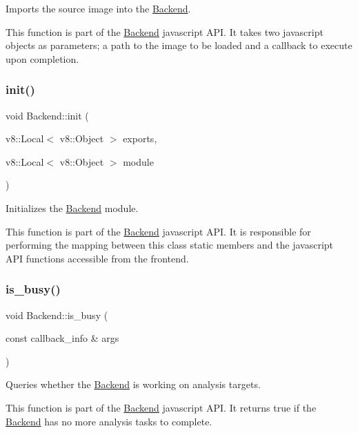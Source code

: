 Imports the source image into the \hyperlink{class_backend}{Backend}. 

This function is part of the \hyperlink{class_backend}{Backend} javascript A\+PI. It takes two javascript objects as parameters; a path to the image to be loaded and a callback to execute upon completion. \mbox{\label{class_backend_a3bbb39435c576093a6b74520ae463398}} 
\subsubsection{\texorpdfstring{init()}{init()}}
{\footnotesize\ttfamily void Backend\+::init (\begin{DoxyParamCaption}\item[{v8\+::\+Local$<$ v8\+::\+Object $>$}]{exports,  }\item[{v8\+::\+Local$<$ v8\+::\+Object $>$}]{module }\end{DoxyParamCaption})\hspace{0.3cm}{\ttfamily [static]}}



Initializes the \hyperlink{class_backend}{Backend} module. 

This function is part of the \hyperlink{class_backend}{Backend} javascript A\+PI. It is responsible for performing the mapping between this class\textquotesingle{} static members and the javascript A\+PI functions accessible from the frontend. \mbox{\label{class_backend_ad23273def503c1749707c57ac92e9212}} 
\subsubsection{\texorpdfstring{is\+\_\+busy()}{is\_busy()}}
{\footnotesize\ttfamily void Backend\+::is\+\_\+busy (\begin{DoxyParamCaption}\item[{const callback\+\_\+info \&}]{args }\end{DoxyParamCaption})\hspace{0.3cm}{\ttfamily [static]}}



Queries whether the \hyperlink{class_backend}{Backend} is working on analysis targets. 

This function is part of the \hyperlink{class_backend}{Backend} javascript A\+PI. It returns true if the \hyperlink{class_backend}{Backend} has no more analysis tasks to complete. \mbox{\label{class_backend_acab7db3b3b0f34798a48ba22a7e3e9ff}} 
